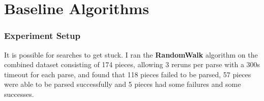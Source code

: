 \documentclass[12pt,a4paper,twoside,openany]{report} \usepackage[pdfborder={0 0 0}]{hyperref}    %
\theoremstyle{definition} \newtheorem{definition}{Definition}[section]
\begin{document}



  \section{Baseline Algorithms} 
  \label{sec:evalBaseline}

  \subsubsection{Experiment Setup}
  It is possible for searches to get stuck. I ran the \textbf{RandomWalk} algorithm on the combined dataset consisting
  of 174 pieces, allowing 3 reruns per parse with a 300s timeout for each parse, and found that 118 pieces failed to be parsed, 57 pieces were able to be
  parsed successfully and 5 pieces had some failures and some successes. 
\end{document}
